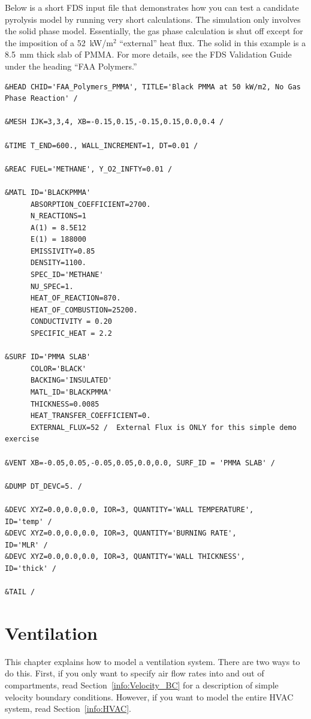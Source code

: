 \documentclass[11pt]{book}
\begin{document}
\noindent Below is a short FDS input file that demonstrates how you can test a candidate pyrolysis model by running very short calculations. The simulation only
involves the solid phase model. Essentially, the gas phase calculation is
shut off except for the imposition of a 52~kW/m$^2$ ``external'' heat flux. The solid in this example is a 8.5~mm thick slab of PMMA. For more
details, see the FDS Validation Guide under the heading ``FAA Polymers.''


\scriptsize
\begin{verbatim}
&HEAD CHID='FAA_Polymers_PMMA', TITLE='Black PMMA at 50 kW/m2, No Gas Phase Reaction' /

&MESH IJK=3,3,4, XB=-0.15,0.15,-0.15,0.15,0.0,0.4 /

&TIME T_END=600., WALL_INCREMENT=1, DT=0.01 /

&REAC FUEL='METHANE', Y_O2_INFTY=0.01 /

&MATL ID='BLACKPMMA'
      ABSORPTION_COEFFICIENT=2700.
      N_REACTIONS=1
      A(1) = 8.5E12
      E(1) = 188000
      EMISSIVITY=0.85
      DENSITY=1100.
      SPEC_ID='METHANE'
      NU_SPEC=1.
      HEAT_OF_REACTION=870.
      HEAT_OF_COMBUSTION=25200.
      CONDUCTIVITY = 0.20
      SPECIFIC_HEAT = 2.2

&SURF ID='PMMA SLAB'
      COLOR='BLACK'
      BACKING='INSULATED'
      MATL_ID='BLACKPMMA'
      THICKNESS=0.0085
      HEAT_TRANSFER_COEFFICIENT=0.
      EXTERNAL_FLUX=52 /  External Flux is ONLY for this simple demo exercise

&VENT XB=-0.05,0.05,-0.05,0.05,0.0,0.0, SURF_ID = 'PMMA SLAB' /

&DUMP DT_DEVC=5. /

&DEVC XYZ=0.0,0.0,0.0, IOR=3, QUANTITY='WALL TEMPERATURE',     ID='temp' /
&DEVC XYZ=0.0,0.0,0.0, IOR=3, QUANTITY='BURNING RATE',         ID='MLR' /
&DEVC XYZ=0.0,0.0,0.0, IOR=3, QUANTITY='WALL THICKNESS',       ID='thick' /

&TAIL /
\end{verbatim} \normalsize










\chapter{Ventilation}

This chapter explains how to model a ventilation system. There are two ways to do this. First, if you only want to specify air flow rates into and out of
compartments, read Section~\ref{info:Velocity_BC} for a description of simple velocity boundary conditions. However, if you want to
model the entire HVAC system, read Section~\ref{info:HVAC}.
\end{document}
